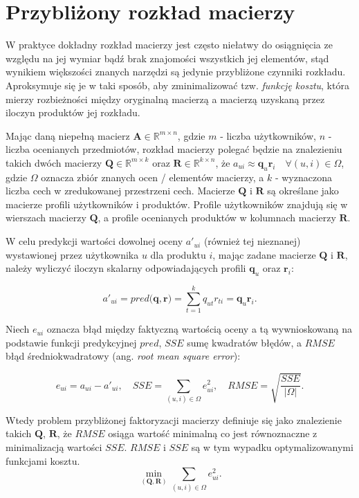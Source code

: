 \documentclass{pracamgr}
\newcommand{\abs}[1]{\lvert#1\rvert}
\begin{document}
\section{Przybliżony rozkład macierzy}
W praktyce dokładny rozkład macierzy jest często niełatwy do osiągnięcia ze względu na jej wymiar bądź brak znajomości wszystkich jej elementów, stąd wynikiem większości znanych narzędzi są jedynie przybliżone czynniki rozkładu. Aproksymuje się je w taki sposób, aby zminimalizować tzw. \textit{funkcję kosztu}, która mierzy rozbieżności między oryginalną macierzą a macierzą uzyskaną przez iloczyn produktów jej rozkładu.

Mając daną niepełną macierz $\mathbf{A} \in \mathbb{R}^{m \times n}$, gdzie $m$ - liczba użytkowników, $n$ - liczba ocenianych przedmiotów, rozkład macierzy polegać będzie na znalezieniu takich dwóch macierzy $\mathbf{Q} \in \mathbb{R}^{m \times k}$ oraz $\mathbf{R} \in \mathbb{R}^{k \times n}$, że $a_{ui} \approx \mathbf{q}_{u} \mathbf{r}_{i} \quad \forall (u, i) \in \Omega$, gdzie $\Omega$ oznacza zbiór znanych ocen / elementów macierzy, a $k$ - wyznaczona liczba cech w zredukowanej przestrzeni cech. Macierze $\mathbf{Q}$ i $\mathbf{R}$ są określane jako macierze profili użytkowników i produktów. Profile użytkowników znajdują się w wierszach macierzy $\mathbf{Q}$, a profile ocenianych produktów w kolumnach macierzy $\mathbf{R}$.

W celu predykcji wartości dowolnej oceny $a'_{ui}$ (również tej nieznanej) wystawionej przez użytkownika $u$ dla produktu $i$, mając zadane macierze $\mathbf{Q}$ i $\mathbf{R}$, należy wyliczyć iloczyn skalarny odpowiadających profili $\mathbf{q}_{u}$ oraz $\mathbf{r}_{i}$:

\[
a'_{ui} = pred(\mathbf{q}, \mathbf{r)} = \sum_{t=1}^{k} q_{ut} r_{ti} = \mathbf{q}_{u} \mathbf{r}_{i}.
\]

Niech $e_{ui}$ oznacza błąd między faktyczną wartością oceny a tą wywnioskowaną na podstawie funkcji predykcyjnej $pred$, $SSE$ sumę kwadratów błędów, a $RMSE$ błąd średniokwadratowy (ang. \textit{root mean square error}):

\[
e_{ui} = a_{ui} - a'_{ui}, \quad SSE = \sum_{(u,i) \in \Omega} e_{ui}^2, \quad RMSE = \sqrt{\frac{SSE}{\abs{\Omega}}}.
\]

Wtedy problem przybliżonej faktoryzacji macierzy definiuje się jako znalezienie takich $\mathbf{Q}$, $\mathbf{R}$, że $RMSE$ osiąga wartość minimalną co jest równoznaczne z minimalizacją wartości $SSE$. $RMSE$ i $SSE$ są w tym wypadku optymalizowanymi funkcjami kosztu.
\[
\min_{(\mathbf{Q}, \mathbf{R})} \sum_{(u,i) \in \Omega} e_{ui}^2.
\]
\end{document}
